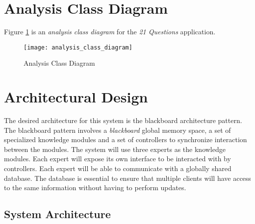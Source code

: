\documentclass[titlepage]{article}
\begin{document}
\begin{enumerate}[a)]
	\end{enumerate}

\newpage

\section{Analysis Class Diagram}
\label{sec:analysis_class_diagram}

Figure \ref{diagram:analysisclass} is an \textit{analysis class diagram} for the \textit{21 Questions} application.

\label{sub:system_architecture}
	\begin{center}
		\begin{figure}[H]
			\texttt{[image: analysis\_class\_diagram]}
			\caption{Analysis Class Diagram}\label{diagram:analysisclass}
		\end{figure}
	\end{center}
	


\section{Architectural Design}
\label{sec:architectural_design}
The desired architecture for this system is the blackboard architecture pattern. The blackboard pattern involves a \textit{blackboard} global memory space, a set of specialized knowledge modules and a set of controllers to synchronize interaction between the modules. The system will use three experts as the knowledge modules. Each expert will expose its own interface to be interacted with by controllers. Each expert will be able to communicate with a globally shared database. The database is essential to ensure that multiple clients will have access to the same information without having to perform updates.

\subsection{System Architecture}
\end{document}
